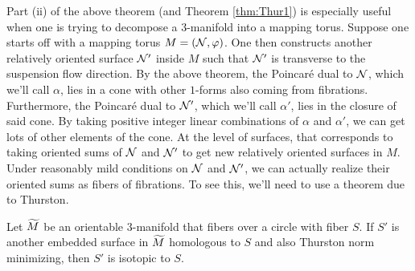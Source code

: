Part (ii) of the above theorem (and Theorem \ref{thm:Thur1}) is especially useful when one is
trying to decompose a $3$-manifold into a mapping torus. Suppose one starts off with a mapping
torus $M = (\mathcal{N}, \varphi)$. One then constructs another relatively oriented surface $\mathcal{N}'$ inside
$M$ such that $\mathcal{N}'$ is transverse to the suspension flow direction. By the above theorem, the
Poincar\'e dual to $\mathcal{N}$, which we'll call $\alpha$, lies in a cone with other $1$-forms also
coming from fibrations. Furthermore, the Poincar\'e dual to $\mathcal{N}'$, which we'll call $\alpha'$,
lies in the closure of said cone. By taking positive integer linear combinations of $\alpha$ and
$\alpha'$, we can get lots of other elements of the cone. At the level of surfaces, that
corresponds to taking oriented sums of $\mathcal{N}$ and $\mathcal{N}'$ to get new relatively oriented surfaces in
$M$. Under reasonably mild conditions on $\mathcal{N}$ and $\mathcal{N}'$, we can actually realize their oriented
sums as fibers of fibrations. To see this, we'll need to use a theorem due to Thurston.

\begin{thm}
  \label{thm:ThurIsotope}
  Let $\widetilde{M}$ be an orientable $3$-manifold that fibers over a circle with fiber $S$. If
  $S'$ is another embedded surface in $\widetilde{M}$ homologous to $S$ and also Thurston norm
  minimizing, then $S'$ is isotopic to $S$.
\end{thm}

